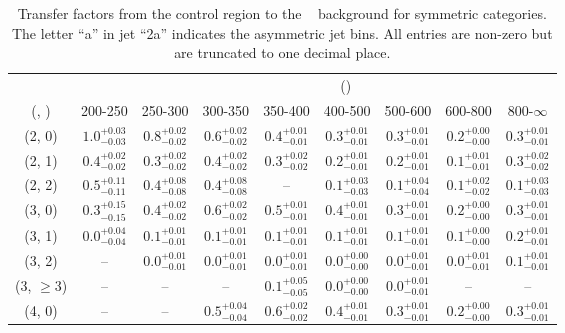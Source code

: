 \begin{table}[h!]
\tiny
\centering
\caption{Transfer factors from the \mj control region to the \zInv~ background for symmetric categories. The letter ``a'' in jet \eg ``2a''  indicates the asymmetric jet bins. All entries are non-zero but are truncated to one decimal place.\label{tab:tf_zinv_mu_sym}}
\begin{tabular}
{ccccccccc}
	\hline\hline
&	& \multicolumn{8}{c}{\scalht (\gev)} \\ 
	 (\njet,  \nb) & 200-250 & 250-300 & 300-350 & 350-400 & 400-500 & 500-600 & 600-800 & 800-$\infty$ \\ [0.8ex] 
\hline
	(2, 0) & $1.0^{+ 0.03 }_{- 0.03 }$ & $0.8^{+ 0.02 }_{- 0.02 }$ & $0.6^{+ 0.02 }_{- 0.02 }$ & $0.4^{+ 0.01 }_{- 0.01 }$ & $0.3^{+ 0.01 }_{- 0.01 }$ & $0.3^{+ 0.01 }_{- 0.01 }$ & $0.2^{+ 0.00 }_{- 0.00 }$ & $0.3^{+ 0.01 }_{- 0.01 }$ \\[0.5ex] 
	(2, 1) & $0.4^{+ 0.02 }_{- 0.02 }$ & $0.3^{+ 0.02 }_{- 0.02 }$ & $0.4^{+ 0.02 }_{- 0.02 }$ & $0.3^{+ 0.02 }_{- 0.02 }$ & $0.2^{+ 0.01 }_{- 0.01 }$ & $0.2^{+ 0.01 }_{- 0.01 }$ & $0.1^{+ 0.01 }_{- 0.01 }$ & $0.3^{+ 0.02 }_{- 0.02 }$ \\[0.5ex] 
	(2, 2) & $0.5^{+ 0.11 }_{- 0.11 }$ & $0.4^{+ 0.08 }_{- 0.08 }$ & $0.4^{+ 0.08 }_{- 0.08 }$ & -- & $0.1^{+ 0.03 }_{- 0.03 }$ & $0.1^{+ 0.04 }_{- 0.04 }$ & $0.1^{+ 0.02 }_{- 0.02 }$ & $0.1^{+ 0.03 }_{- 0.03 }$ \\[0.5ex] 
	(3, 0) & $0.3^{+ 0.15 }_{- 0.15 }$ & $0.4^{+ 0.02 }_{- 0.02 }$ & $0.6^{+ 0.02 }_{- 0.02 }$ & $0.5^{+ 0.01 }_{- 0.01 }$ & $0.4^{+ 0.01 }_{- 0.01 }$ & $0.3^{+ 0.01 }_{- 0.01 }$ & $0.2^{+ 0.00 }_{- 0.00 }$ & $0.3^{+ 0.01 }_{- 0.01 }$ \\[0.5ex] 
	(3, 1) & $0.0^{+ 0.04 }_{- 0.04 }$ & $0.1^{+ 0.01 }_{- 0.01 }$ & $0.1^{+ 0.01 }_{- 0.01 }$ & $0.1^{+ 0.01 }_{- 0.01 }$ & $0.1^{+ 0.01 }_{- 0.01 }$ & $0.1^{+ 0.01 }_{- 0.01 }$ & $0.1^{+ 0.00 }_{- 0.00 }$ & $0.2^{+ 0.01 }_{- 0.01 }$ \\[0.5ex] 
	(3, 2) & -- & $0.0^{+ 0.01 }_{- 0.01 }$ & $0.0^{+ 0.01 }_{- 0.01 }$ & $0.0^{+ 0.01 }_{- 0.01 }$ & $0.0^{+ 0.00 }_{- 0.00 }$ & $0.0^{+ 0.01 }_{- 0.01 }$ & $0.0^{+ 0.01 }_{- 0.01 }$ & $0.1^{+ 0.01 }_{- 0.01 }$ \\[0.5ex] 
	(3, $\ge3$) & -- & -- & -- & $0.1^{+ 0.05 }_{- 0.05 }$ & $0.0^{+ 0.00 }_{- 0.00 }$ & $0.0^{+ 0.01 }_{- 0.01 }$ & -- & -- \\[0.5ex] 
	(4, 0) & -- & -- & $0.5^{+ 0.04 }_{- 0.04 }$ & $0.6^{+ 0.02 }_{- 0.02 }$ & $0.4^{+ 0.01 }_{- 0.01 }$ & $0.3^{+ 0.01 }_{- 0.01 }$ & $0.2^{+ 0.00 }_{- 0.00 }$ & $0.3^{+ 0.01 }_{- 0.01 }$ \\[0.5ex] 

\end{tabular}
\end{table}
